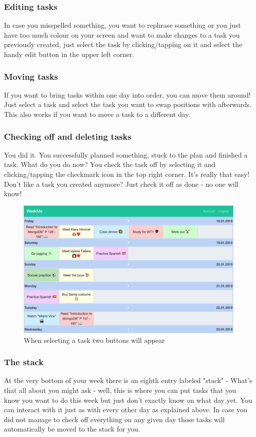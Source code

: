 \subsubsection{Editing tasks}
In case you misspelled something, you want to rephrase something or you just have too much colour on your screen and want to make changes to a task you previously created, just select the task by clicking/tapping on it and select the handy edit button in the upper left corner. 
\subsubsection{Moving tasks}
If you want to bring tasks within one day into order, you can move them around! Just select a task and select the task you want to swap positions with afterwards. 
This also works if you want to move a task to a different day. 
\subsubsection{Checking off and deleting tasks}
You did it. You successfully planned something, stuck to the plan and finished a task. What do you do now? You check the task off by selecting it and clicking/tapping the checkmark icon in the top right corner. It's really that easy! \\
Don't like a task you created anymore? Just check it off as done - no one will know!

\begin{figure}[H] 
	\centering 
	\includegraphics[width=14cm]{figures/user_docu_selected_task_desktop.png}   
	\caption[WeekMe account page]{When selecting a task two buttons will appear}       
	\label{fig: Selected task on desktop}     
\end{figure}  

\subsubsection{The stack}
At the very bottom of your week there is an eighth entry labeled "stack" - What's that all about you might ask - well, this is where you can put tasks that you know you want to do this week but just don't exactly know on what day yet.  You can interact with it just as with every other day as explained above.  
In case you did not manage to check off everything on any given day those tasks will automatically be moved to the stack for you.